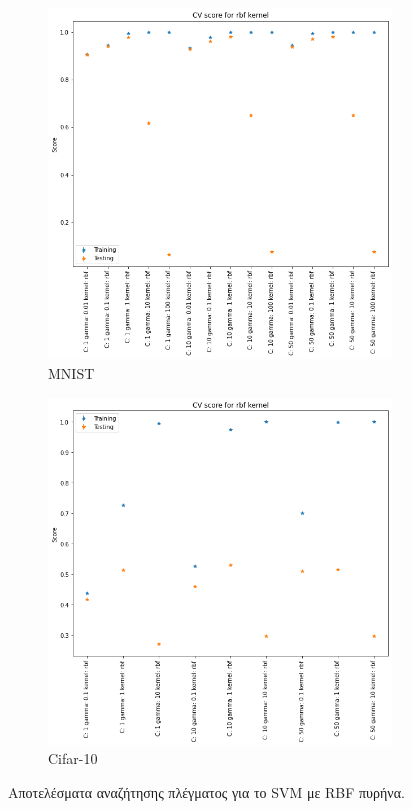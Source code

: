 \documentclass[a4paper]{article}
\begin{document}
\begin{figure}[H]
    \centering

    \begin{subfigure}[t]{0.45\linewidth}
    \includegraphics[width=\linewidth]{figures/mnist/cv_results_rbf.png}
    \caption{MNIST}
    \end{subfigure}
    \begin{subfigure}[t]{0.45\linewidth}
    \includegraphics[width=\linewidth]{figures/cifar/cv_results_rbf.png}
    \caption{Cifar-10}
    \end{subfigure}

    \caption{Αποτελέσματα αναζήτησης πλέγματος για το SVM με RBF πυρήνα.}
    \label{fig:cv_rbf}
\end{figure}
\end{document}
